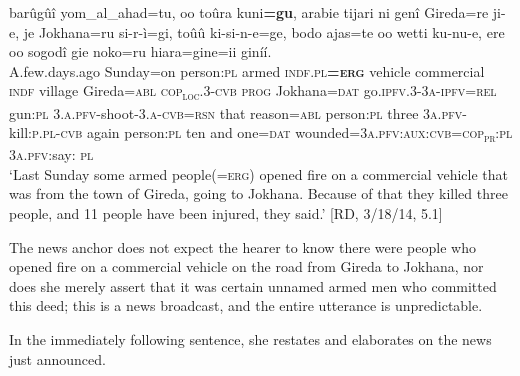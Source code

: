 \documentclass[output=paper,modfonts]{langscibook}
\begin{document}
\ea\label{ex:wolfe:9}
\gll barûgûî yom\_al\_ahad=tu, oo toûra kuni\textbf{=gu}, arabie tijari ni genî Gireda=re ji-e, je Jokhana=ru si-r-ì=gi, toûû ki-si-n-e=ge, bodo ajas=te oo wetti ku-nu-e, ere oo sogodî gie noko=ru hiara=gine=ii giníí.\\
A.few.days.ago Sunday=on person:\textsc{pl} armed \textsc{indf}.\textsc{pl}\textbf{=}\textsc{\textbf{erg}} vehicle commercial \textsc{indf} village Gireda=\textsc{abl} \textsc{cop}\textsc{\textsubscript{loc}}\textsc{.3-}\textsc{cvb} \textsc{prog} Jokhana=\textsc{dat} go.\textsc{ipfv}\textsc{.3-3}\textsc{a}-\textsc{ipfv}=\textsc{rel} gun:\textsc{pl} \textsc{3.}\textsc{a}.\textsc{pfv}-shoot-\textsc{3.}\textsc{a}-\textsc{cvb}=\textsc{rsn} that reason=\textsc{abl} person:\textsc{pl} three \textsc{3}\textsc{a}.\textsc{pfv}-kill:\textsc{p}.\textsc{pl}-\textsc{cvb} again person:\textsc{pl} ten and one=\textsc{dat} wounded\textsc{=3}\textsc{a}.\textsc{pfv}:\textsc{aux}:\textsc{cvb}=\textsc{cop}\textsc{\textsubscript{pr}}:\textsc{pl} \textsc{3}\textsc{a}.\textsc{pfv}:say: \textsc{pl}\\
\glt ‘Last Sunday some armed people(=\textsc{erg}) opened fire on a commercial vehicle that was from the town of Gireda, going to Jokhana. Because of that they killed three people, and 11 people have been injured, they said.’ [RD, 3/18/14, 5.1]
\z

The news anchor does not expect the hearer to know there were people who opened fire on a commercial vehicle on the road from Gireda to Jokhana, nor does she merely assert that it was certain unnamed armed men who committed this deed; this is a news broadcast, and the entire utterance is unpredictable. 

In the immediately following sentence, she restates and elaborates on the news just announced. 
\end{document}
